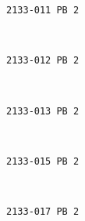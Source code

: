 \documentclass[11pt]{article}
\begin{document}
    \begin{Verbatim}[commandchars=\\\{\}]
2133-011 PB 2

    \end{Verbatim}

    \begin{center}
    \end{center}
    { \hspace*{\fill} \\}
    
    \begin{Verbatim}[commandchars=\\\{\}]
2133-012 PB 2

    \end{Verbatim}

    \begin{center}
    \end{center}
    { \hspace*{\fill} \\}
    
    \begin{Verbatim}[commandchars=\\\{\}]
2133-013 PB 2

    \end{Verbatim}

    \begin{center}
    \end{center}
    { \hspace*{\fill} \\}
    
    \begin{Verbatim}[commandchars=\\\{\}]
2133-015 PB 2

    \end{Verbatim}

    \begin{center}
    \end{center}
    { \hspace*{\fill} \\}
    
    \begin{Verbatim}[commandchars=\\\{\}]
2133-017 PB 2

    \end{Verbatim}
\end{document}
